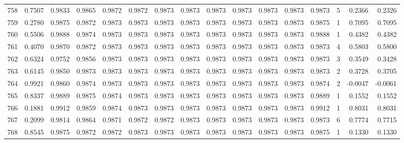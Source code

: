 \begin{tabular}{lrrrrrrrrrrrrrrr}
758 &      0.7507 &  0.9833 &  0.9865 &  0.9872 &  0.9872 &  0.9873 &  0.9873 &  0.9873 &  0.9873 &  0.9873 &   0.9873 &     0.9873 &      5 &                    0.2366 &                     0.2326 \\
759 &      0.2780 &  0.9875 &  0.9872 &  0.9873 &  0.9873 &  0.9873 &  0.9873 &  0.9873 &  0.9873 &  0.9873 &   0.9873 &     0.9875 &      1 &                    0.7095 &                     0.7095 \\
760 &      0.5506 &  0.9888 &  0.9874 &  0.9873 &  0.9873 &  0.9873 &  0.9873 &  0.9873 &  0.9873 &  0.9873 &   0.9873 &     0.9888 &      1 &                    0.4382 &                     0.4382 \\
761 &      0.4070 &  0.9870 &  0.9872 &  0.9873 &  0.9873 &  0.9873 &  0.9873 &  0.9873 &  0.9873 &  0.9873 &   0.9873 &     0.9873 &      4 &                    0.5803 &                     0.5800 \\
762 &      0.6324 &  0.9752 &  0.9856 &  0.9873 &  0.9873 &  0.9873 &  0.9873 &  0.9873 &  0.9873 &  0.9873 &   0.9873 &     0.9873 &      3 &                    0.3549 &                     0.3428 \\
763 &      0.6145 &  0.9850 &  0.9873 &  0.9873 &  0.9873 &  0.9873 &  0.9873 &  0.9873 &  0.9873 &  0.9873 &   0.9873 &     0.9873 &      2 &                    0.3728 &                     0.3705 \\
764 &      0.9921 &  0.9860 &  0.9874 &  0.9873 &  0.9873 &  0.9873 &  0.9873 &  0.9873 &  0.9873 &  0.9873 &   0.9873 &     0.9874 &      2 &                   -0.0047 &                    -0.0061 \\
765 &      0.8337 &  0.9889 &  0.9875 &  0.9874 &  0.9873 &  0.9873 &  0.9873 &  0.9873 &  0.9873 &  0.9873 &   0.9873 &     0.9889 &      1 &                    0.1552 &                     0.1552 \\
766 &      0.1881 &  0.9912 &  0.9859 &  0.9874 &  0.9873 &  0.9873 &  0.9873 &  0.9873 &  0.9873 &  0.9873 &   0.9873 &     0.9912 &      1 &                    0.8031 &                     0.8031 \\
767 &      0.2099 &  0.9814 &  0.9864 &  0.9871 &  0.9872 &  0.9872 &  0.9873 &  0.9873 &  0.9873 &  0.9873 &   0.9873 &     0.9873 &      6 &                    0.7774 &                     0.7715 \\
768 &      0.8545 &  0.9875 &  0.9872 &  0.9872 &  0.9873 &  0.9873 &  0.9873 &  0.9873 &  0.9873 &  0.9873 &   0.9873 &     0.9875 &      1 &                    0.1330 &                     0.1330 \\

\end{tabular}
